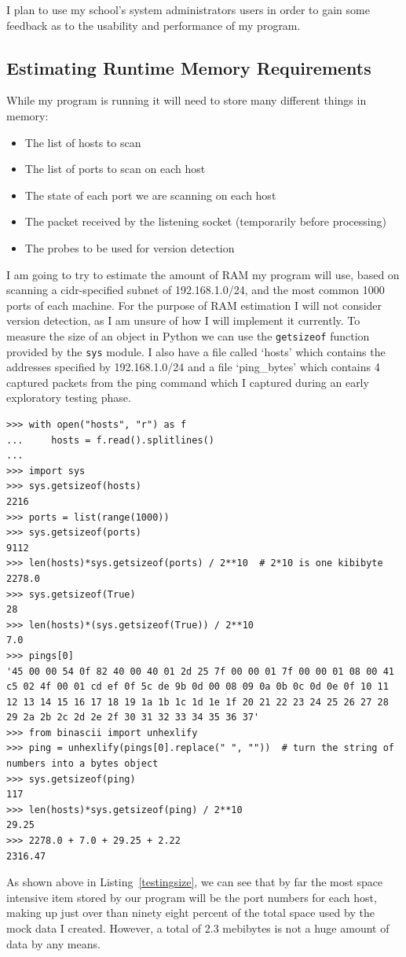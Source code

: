 \documentclass[titlepage]{article}
\let\Oldsubsection\subsection{}
\renewcommand{\subsection}{\FloatBarrier\Oldsubsection}
\begin{document}
I plan to use my school's system administrators users in order to gain some feedback
as to the usability and performance of my program.

\subsection{Estimating Runtime Memory Requirements}

While my program is running it will need to store many different things in memory:
\begin{itemize}
  \item{The list of hosts to scan}
  \item{The list of ports to scan on each host}
  \item{The state of each port we are scanning on each host}
  \item{The packet received by the listening socket (temporarily before processing)}
  \item{The probes to be used for version detection}
\end{itemize}
I am going to try to estimate the amount of RAM my program will use, based on scanning a 
\gls{cidr}-specified subnet of 192.168.1.0/24, and the most common 1000 ports of each machine.
For the purpose of RAM estimation I will not consider version detection, as I am unsure of how I will implement it currently.
To measure the size of an object in Python we can use the \verb|getsizeof| function provided by the
\verb|sys| module. I also have a file called `hosts' which contains the addresses specified by
192.168.1.0/24 and a file `ping\_bytes' which contains 4 captured packets from the ping command
which I captured during an early exploratory testing phase.
\lstset{language=Python}
\begin{lstlisting}[label=testingsize,caption=\textit{Some testing I did on the size of Python objects.}]
>>> with open("hosts", "r") as f
...     hosts = f.read().splitlines()
... 
>>> import sys
>>> sys.getsizeof(hosts)
2216
>>> ports = list(range(1000))
>>> sys.getsizeof(ports)
9112
>>> len(hosts)*sys.getsizeof(ports) / 2**10  # 2*10 is one kibibyte
2278.0
>>> sys.getsizeof(True)
28
>>> len(hosts)*(sys.getsizeof(True)) / 2**10
7.0
>>> pings[0]
'45 00 00 54 0f 82 40 00 40 01 2d 25 7f 00 00 01 7f 00 00 01 08 00 41 c5 02 4f 00 01 cd ef 0f 5c de 9b 0d 00 08 09 0a 0b 0c 0d 0e 0f 10 11 12 13 14 15 16 17 18 19 1a 1b 1c 1d 1e 1f 20 21 22 23 24 25 26 27 28 29 2a 2b 2c 2d 2e 2f 30 31 32 33 34 35 36 37'
>>> from binascii import unhexlify
>>> ping = unhexlify(pings[0].replace(" ", ""))  # turn the string of numbers into a bytes object
>>> sys.getsizeof(ping)
117
>>> len(hosts)*sys.getsizeof(ping) / 2**10
29.25
>>> 2278.0 + 7.0 + 29.25 + 2.22
2316.47
\end{lstlisting}
As shown above in Listing~\ref{testingsize}, we can see that by far the most space intensive item stored
by our program will be the port numbers for each host, making up just over than ninety eight percent
of the total space used by the mock data I created. However, a total of 2.3 mebibytes is not a huge
amount of data by any means.
\end{document}
